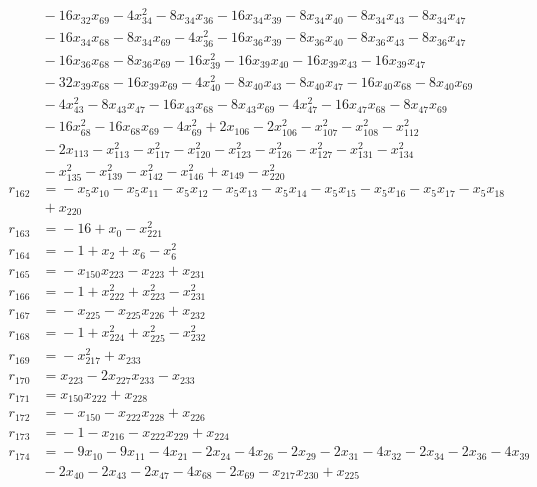 \begin{align*}
&{}-16x_{32}x_{69} -4x_{34}^{2} -8x_{34}x_{36} -16x_{34}x_{39} -8x_{34}x_{40} -8x_{34}x_{43} -8x_{34}x_{47} \\
&{}-16x_{34}x_{68} -8x_{34}x_{69} -4x_{36}^{2} -16x_{36}x_{39} -8x_{36}x_{40} -8x_{36}x_{43} -8x_{36}x_{47} \\
&{}-16x_{36}x_{68} -8x_{36}x_{69} -16x_{39}^{2} -16x_{39}x_{40} -16x_{39}x_{43} -16x_{39}x_{47} \\
&{}-32x_{39}x_{68} -16x_{39}x_{69} -4x_{40}^{2} -8x_{40}x_{43} -8x_{40}x_{47} -16x_{40}x_{68} -8x_{40}x_{69} \\
&{}-4x_{43}^{2} -8x_{43}x_{47} -16x_{43}x_{68} -8x_{43}x_{69} -4x_{47}^{2} -16x_{47}x_{68} -8x_{47}x_{69} \\
&{}-16x_{68}^{2} -16x_{68}x_{69} -4x_{69}^{2} +2x_{106} -2x_{106}^{2} -x_{107}^{2} -x_{108}^{2} -x_{112}^{2} \\
&{}-2x_{113} -x_{113}^{2} -x_{117}^{2} -x_{120}^{2} -x_{123}^{2} -x_{126}^{2} -x_{127}^{2} -x_{131}^{2} -x_{134}^{2} \\
&{}-x_{135}^{2} -x_{139}^{2} -x_{142}^{2} -x_{146}^{2} +x_{149} -x_{220}^{2} \\
r_{162} &={}-x_{5}x_{10} -x_{5}x_{11} -x_{5}x_{12} -x_{5}x_{13} -x_{5}x_{14} -x_{5}x_{15} -x_{5}x_{16} -x_{5}x_{17} -x_{5}x_{18} \\
&{}+x_{220} \\
r_{163} &={}-16 +x_{0} -x_{221}^{2} \\
r_{164} &={}-1 +x_{2} +x_{6} -x_{6}^{2} \\
r_{165} &={}-x_{150}x_{223} -x_{223} +x_{231} \\
r_{166} &={}-1 +x_{222}^{2} +x_{223}^{2} -x_{231}^{2} \\
r_{167} &={}-x_{225} -x_{225}x_{226} +x_{232} \\
r_{168} &={}-1 +x_{224}^{2} +x_{225}^{2} -x_{232}^{2} \\
r_{169} &={}-x_{217}^{2} +x_{233} \\
r_{170} &={}x_{223} -2x_{227}x_{233} -x_{233} \\
r_{171} &={}x_{150}x_{222} +x_{228} \\
r_{172} &={}-x_{150} -x_{222}x_{228} +x_{226} \\
r_{173} &={}-1 -x_{216} -x_{222}x_{229} +x_{224} \\
r_{174} &={}-9x_{10} -9x_{11} -4x_{21} -2x_{24} -4x_{26} -2x_{29} -2x_{31} -4x_{32} -2x_{34} -2x_{36} -4x_{39} \\
&{}-2x_{40} -2x_{43} -2x_{47} -4x_{68} -2x_{69} -x_{217}x_{230} +x_{225} \\

\end{align*}
